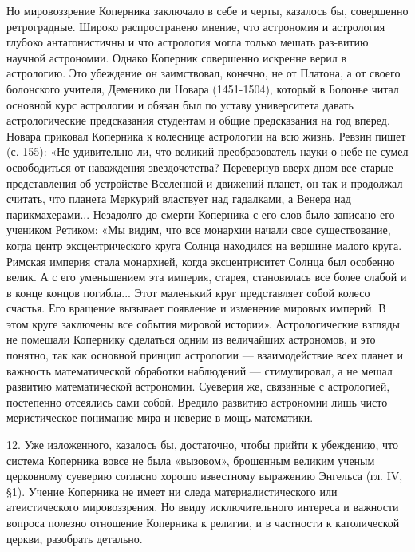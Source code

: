 Но мировоззрение Коперника заключало в себе и черты, казалось бы,
совершенно ретроградные. Широко распространено мнение, что астрономия
и астрология глубоко антагонистичны и что астрология могла только
мешать раз-витию научной астрономии. Однако Коперник совершенно
искренне верил в астрологию. Это убеждение он заимствовал, конечно, не
от Платона, а от своего болонского учителя, Деменико ди Новара
(1451-1504), который в Болонье читал основной курс астрологии и обязан
был по уставу университета давать астрологические предсказания
студентам и общие предсказания на год вперед. Новара приковал
Коперника к колеснице астрологии на всю жизнь. Ревзин пишет (с. 155):
«Не удивительно ли, что великий преобразователь науки о небе не сумел
освободиться от наваждения звездочетства? Перевернув вверх дном все
старые представления об устройстве Вселенной и движений планет, он так
и продолжал считать, что планета Меркурий властвует над гадалками, а
Венера над парикмахерами... Незадолго до смерти Коперника с его слов
было записано его учеником Ретиком: «Мы видим, что все монархии начали
свое существование, когда центр эксцентрического круга Солнца
находился на вершине малого круга. Римская империя стала монархией,
когда эксцентриситет Солнца был особенно велик. А с его уменьшением
эта империя, старея, становилась все более слабой и в конце концов
погибла... Этот маленький круг представляет собой колесо счастья. Его
вращение вызывает появление и изменение мировых империй. В этом круге
заключены все события мировой истории». Астрологические взгляды не
помешали Копернику сделаться одним из величайших астрономов, и это
понятно, так как основной принцип астрологии --- взаимодействие всех
планет и важность математической обработки наблюдений ---
стимулировал, а не мешал развитию математической астрономии. Суеверия
же, связанные с астрологией, постепенно отсеялись сами собой. Вредило
развитию астрономии лишь чисто меристическое понимание мира и неверие
в мощь математики.

12. Уже изложенного, казалось бы, достаточно, чтобы прийти к
убеждению, что система Коперника вовсе не была «вызовом», брошенным
великим ученым церковному суеверию согласно хорошо известному
выражению Энгельса (гл. IV, §1). Учение Коперника не имеет ни следа
материалистического или атеистического мировоззрения. Но ввиду
исключительного интереса и важности вопроса полезно отношение
Коперника к религии, и в частности к католической церкви, разобрать
детально.

